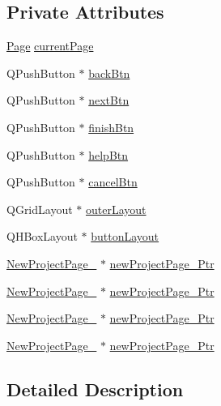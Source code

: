 \subsection*{Private Attributes}
\begin{DoxyCompactItemize}
\item 
\hyperlink{class_new_project_gui_a7dd25d019611ddc0fd2b357e0f3a446c}{Page} \hyperlink{class_new_project_gui_ac1b0414d92030b3d545020fc889b1313}{current\-Page}
\item 
Q\-Push\-Button $\ast$ \hyperlink{class_new_project_gui_a9dd8fc63be73f0aa6f7c61349dff95a2}{back\-Btn}
\item 
Q\-Push\-Button $\ast$ \hyperlink{class_new_project_gui_af79d8f88c0d0aa8e783240c2e6ba6e8b}{next\-Btn}
\item 
Q\-Push\-Button $\ast$ \hyperlink{class_new_project_gui_ab5d0c64c04e2c9c1ff6e57191e35f79f}{finish\-Btn}
\item 
Q\-Push\-Button $\ast$ \hyperlink{class_new_project_gui_a33ab8b2813bd5f5ae52c7d91c996f61f}{help\-Btn}
\item 
Q\-Push\-Button $\ast$ \hyperlink{class_new_project_gui_a91a081ae496b19cd64dd33b292b1761e}{cancel\-Btn}
\item 
Q\-Grid\-Layout $\ast$ \hyperlink{class_new_project_gui_ab8c8c2da1803bbbc90d8aa5e90ac9aec}{outer\-Layout}
\item 
Q\-H\-Box\-Layout $\ast$ \hyperlink{class_new_project_gui_a7281efc1048f02fae1610c1fa0925473}{button\-Layout}
\item 
\hyperlink{class_new_project_page__1}{New\-Project\-Page\-\_} $\ast$ \hyperlink{class_new_project_gui_a21cb8b6c6a0b743e7bdc2e4e4ff7e839}{new\-Project\-Page\-\_\-Ptr}
\item 
\hyperlink{class_new_project_page__2}{New\-Project\-Page\-\_} $\ast$ \hyperlink{class_new_project_gui_a4437d1c791747dcf286ef389f952116a}{new\-Project\-Page\-\_\-Ptr}
\item 
\hyperlink{class_new_project_page__3}{New\-Project\-Page\-\_} $\ast$ \hyperlink{class_new_project_gui_a16ff0aedd402588686ae3f02b4226fc0}{new\-Project\-Page\-\_\-Ptr}
\item 
\hyperlink{class_new_project_page__4}{New\-Project\-Page\-\_} $\ast$ \hyperlink{class_new_project_gui_a4c4e20d7598c3c61a45eb51a0332a326}{new\-Project\-Page\-\_\-Ptr}
\end{DoxyCompactItemize}


\subsection{Detailed Description}


